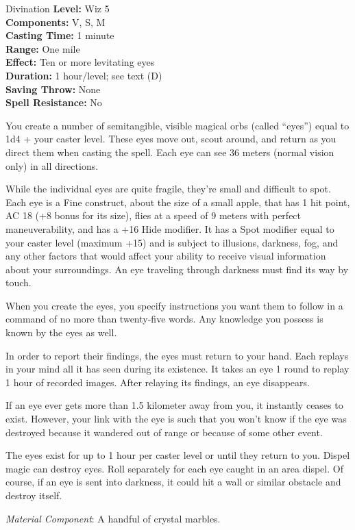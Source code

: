 {Divination}
{
	\textbf{Level:}
	Wiz 5\\
	\textbf{Components:}
	V, S, M\\
	\textbf{Casting Time:}
	1 minute\\
	\textbf{Range:}
	One mile\\
	\textbf{Effect:}
	Ten or more levitating eyes\\
	\textbf{Duration:}
	1 hour/level; see text (D)\\
	\textbf{Saving Throw:}
	None\\
	\textbf{Spell Resistance:}
	No\\
}
{
	You create a number of semitangible, visible magical orbs (called ``eyes'') equal to 1d4 + your caster level. These eyes move out, scout around, and return as you direct them when casting the spell. Each eye can see 36 meters (normal vision only) in all directions.

	While the individual eyes are quite fragile, they're small and difficult to spot. Each eye is a Fine construct, about the size of a small apple, that has 1 hit point, AC 18 (+8 bonus for its size), flies at a speed of 9 meters with perfect maneuverability, and has a +16 Hide modifier. It has a Spot modifier equal to your caster level (maximum +15) and is subject to illusions, darkness, fog, and any other factors that would affect your ability to receive visual information about your surroundings. An eye traveling through darkness must find its way by touch.

	When you create the eyes, you specify instructions you want them to follow in a command of no more than twenty-five words. Any knowledge you possess is known by the eyes as well.

	In order to report their findings, the eyes must return to your hand. Each replays in your mind all it has seen during its existence. It takes an eye 1 round to replay 1 hour of recorded images. After relaying its findings, an eye disappears.

	If an eye ever gets more than 1.5 kilometer away from you, it instantly ceases to exist. However, your link with the eye is such that you won't know if the eye was destroyed because it wandered out of range or because of some other event.

	The eyes exist for up to 1 hour per caster level or until they return to you. Dispel magic can destroy eyes. Roll separately for each eye caught in an area dispel. Of course, if an eye is sent into darkness, it could hit a wall or similar obstacle and destroy itself.

	\textit{Material Component}:
	A handful of crystal marbles.

}

